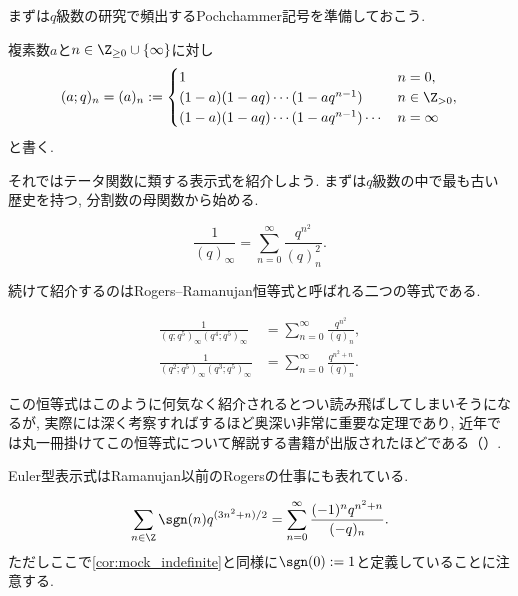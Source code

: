 \documentclass[11pt,b5paper,oneside,lualatex]{ltjsarticle} %
\numberwithin{equation}{section} %
\begin{document}
まずは$ q $級数の研究で頻出するPochchammer記号を準備しておこう. 

\begin{dfn}[Pochhammer記号]
	複素数$ a $と$ n \in \Z_{\ge 0} \cup \{ \infty \} $に対し
	\[
	(a; q)_n = (a)_n :=
	\begin{cases}
		1 & n=0, \\
		(1 - a) (1 - aq) \cdots (1 - aq^{n-1}) & n \in \Z_{>0}, \\
		(1 - a) (1 - aq) \cdots (1 - aq^{n-1}) \cdots & n = \infty
	\end{cases}
	\]
	と書く. 
\end{dfn}

それではテータ関数に類する表示式を紹介しよう. 
まずは$ q $級数の中で最も古い歴史を持つ, 分割数の母関数から始める. 

\begin{thm}
	\label{thm:Jacobi}
	\[
	\frac{1}{(q)_\infty} = \sum_{n=0}^{\infty} \frac{q^{n^2}}{(q)_n^2}.
	\]
\end{thm}

続けて紹介するのはRogers--Ramanujan恒等式と呼ばれる二つの等式である. 

\begin{thm}
	\begin{align}
		\frac{1}{(q; q^5)_\infty (q^4; q^5)_\infty} 
		&=
		\sum_{n=0}^{\infty} \frac{q^{n^2}}{(q)_n},
		\\
		\frac{1}{(q^2; q^5)_\infty (q^3; q^5)_\infty} 
		&=
		\sum_{n=0}^{\infty} \frac{q^{n^2 + n}}{(q)_n}.
	\end{align}
\end{thm}

この恒等式はこのように何気なく紹介されるとつい読み飛ばしてしまいそうになるが, 実際には深く考察すればするほど奥深い非常に重要な定理であり, 近年では丸一冊掛けてこの恒等式について解説する書籍が出版されたほどである（\cite{魅惑}）. 

Euler型表示式はRamanujan以前のRogersの仕事にも表れている. 

\begin{thm}
	\begin{align}	
		\sum_{n \in \Z} \sgn(n) q^{(3n^2 + n)/2}
		=
		\sum_{n=0}^{\infty} \frac{(-1)^n q^{n^2 + n}}{(-q)_n}.
	\end{align}
	ただしここで\cref{cor:mock_indefinite}と同様に$ \sgn(0) := 1 $と定義していることに注意する. 
\end{thm}
\end{document}
